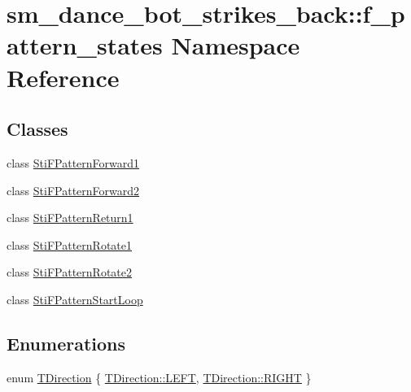 \hypertarget{namespacesm__dance__bot__strikes__back_1_1f__pattern__states}{}\section{sm\+\_\+dance\+\_\+bot\+\_\+strikes\+\_\+back\+:\+:f\+\_\+pattern\+\_\+states Namespace Reference}
\label{namespacesm__dance__bot__strikes__back_1_1f__pattern__states}
\subsection*{Classes}
\begin{DoxyCompactItemize}
\item 
class \hyperlink{structsm__dance__bot__strikes__back_1_1f__pattern__states_1_1StiFPatternForward1}{Sti\+F\+Pattern\+Forward1}
\item 
class \hyperlink{structsm__dance__bot__strikes__back_1_1f__pattern__states_1_1StiFPatternForward2}{Sti\+F\+Pattern\+Forward2}
\item 
class \hyperlink{structsm__dance__bot__strikes__back_1_1f__pattern__states_1_1StiFPatternReturn1}{Sti\+F\+Pattern\+Return1}
\item 
class \hyperlink{structsm__dance__bot__strikes__back_1_1f__pattern__states_1_1StiFPatternRotate1}{Sti\+F\+Pattern\+Rotate1}
\item 
class \hyperlink{structsm__dance__bot__strikes__back_1_1f__pattern__states_1_1StiFPatternRotate2}{Sti\+F\+Pattern\+Rotate2}
\item 
class \hyperlink{structsm__dance__bot__strikes__back_1_1f__pattern__states_1_1StiFPatternStartLoop}{Sti\+F\+Pattern\+Start\+Loop}
\end{DoxyCompactItemize}
\subsection*{Enumerations}
\begin{DoxyCompactItemize}
\item 
enum \hyperlink{namespacesm__dance__bot__strikes__back_1_1f__pattern__states_a606b9ab33830b5491413ff90dc1ea1ac}{T\+Direction} \{ \hyperlink{namespacesm__dance__bot__strikes__back_1_1f__pattern__states_a606b9ab33830b5491413ff90dc1ea1aca684d325a7303f52e64011467ff5c5758}{T\+Direction\+::\+L\+E\+FT}, 
\hyperlink{namespacesm__dance__bot__strikes__back_1_1f__pattern__states_a606b9ab33830b5491413ff90dc1ea1aca21507b40c80068eda19865706fdc2403}{T\+Direction\+::\+R\+I\+G\+HT}
 \}
\end{DoxyCompactItemize}


